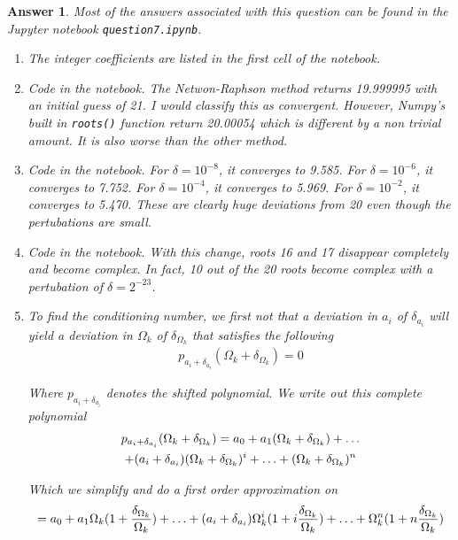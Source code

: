 \documentclass[12pt]{article}
\theoremstyle{colon}
\newtheorem*{answer}{Answer}
\begin{document}
\begin{answer}
  Most of the answers associated with this question can be found in the Jupyter notebook \texttt{question7.ipynb}.

  \begin{enumerate}[label=\alph*)]
    \item The integer coefficients are listed in the first cell of the notebook.

    \item Code in the notebook. The Netwon-Raphson method returns 19.999995 with an initial guess of 21. I would classify this as convergent. However, Numpy's built in \texttt{roots()} function return 20.00054 which is different by a non trivial amount. It is also worse than the other method.

    \item Code in the notebook. For $\delta = 10^{-8}$, it converges to 9.585. For $\delta = 10^{-6}$, it converges to 7.752. For $\delta = 10^{-4}$, it converges to 5.969. For $\delta = 10^{-2}$, it converges to 5.470. These are clearly huge deviations from 20 even though the pertubations are small.

    \item Code in the notebook. With this change, roots 16 and 17 disappear completely and become complex. In fact, 10 out of the 20 roots become complex with a pertubation of $\delta = 2^{-23}$.

    \item To find the conditioning number, we first not that a deviation in $a_i$ of $\delta_{a_i}$ will yield a deviation in $\Omega_k$ of $\delta_{\Omega_k}$ that satisfies the following
      \begin{gather*}
        p_{a_i + \delta_{a_i}}(\Omega_k + \delta_{\Omega_k}) = 0
      \end{gather*}

      Where $p_{a_i + \delta_{a_i}}$ denotes the shifted polynomial. We write out this complete polynomial
      \begin{gather*}
        p_{a_i + \delta_{a_i}}(\Omega_k + \delta_{\Omega_k}) = a_0 + a_1(\Omega_k + \delta_{\Omega_k}) + \mathellipsis \\
        + (a_i + \delta_{a_i})(\Omega_k + \delta_{\Omega_k})^i + \mathellipsis + (\Omega_k + \delta_{\Omega_k})^n
      \end{gather*}

      Which we simplify and do a first order approximation on
      \begin{gather*}
        = a_0 + a_1 \Omega_k (1 + \frac{\delta_{\Omega_k}}{\Omega_k}) + \mathellipsis + (a_i + \delta_{a_i})\Omega_k^i (1 + i\frac{\delta_{\Omega_k}}{\Omega_k}) + \mathellipsis + \Omega_k^n (1 + n \frac{\delta_{\Omega_k}}{\Omega_k })
      \end{gather*}


\end{enumerate}
\end{answer}
\end{document}

